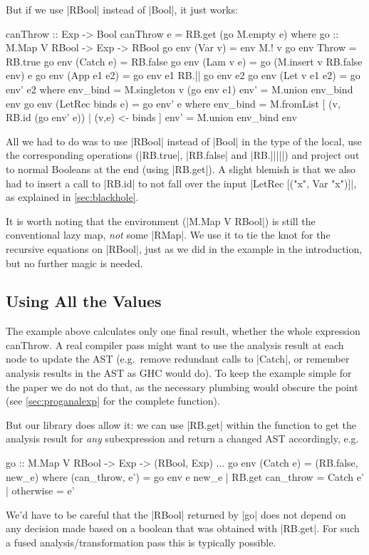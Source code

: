 \documentclass[manuscript,screen,acmsmall,nonacm]{acmart}
\begin{document}
But if we use |RBool| instead of |Bool|, it just works:
\restorecolumns
\begin{code}
canThrow :: Exp -> Bool
canThrow e = RB.get (go M.empty e)
  where
    go :: M.Map V RBool -> Exp -> RBool
    go env (Var v)          = env M.! v
    go env Throw            = RB.true
    go env (Catch e)        = RB.false
    go env (Lam v e)        = go (M.insert v RB.false env) e
    go env (App e1 e2)      = go env e1 RB.|| go env e2
    go env (Let v e1 e2)    = go env' e2
      where
        env_bind  = M.singleton v (go env e1)
        env'      = M.union env_bind env
    go env (LetRec binds e) = go env' e
      where
        env_bind  = M.fromList [ (v, RB.id (go env' e)) | (v,e) <- binds ]
        env'      = M.union env_bind env
\end{code}
All we had to do was to use |RBool| instead of |Bool| in the type of the local, use the corresponding operations (|RB.true|, |RB.false| and |RB.|||||) and  project out to normal Booleans at the end (using |RB.get|). A slight blemish is that we also had to insert a call to |RB.id| to not fall over the input |LetRec [("x", Var "x")]|, as explained in \cref{sec:blackhole}.

It is worth noting that the environment (|M.Map V RBool|) is still the conventional lazy map, \emph{not} some |RMap|. We use it to tie the knot for the recursive equations on |RBool|, just as we did in the example in the introduction, but no further magic is needed.

\subsection{Using All the Values}\label{sec:all-values}

The example above calculates only one final result, whether the whole expression canThrow. A real compiler pass might want to use the analysis result at each node to update the AST (e.g.\ remove redundant calls to |Catch|, or remember analysis results in the AST as GHC would do). To keep the example simple for the paper we do not do that, as the necessary plumbing would obscure the point (see \cref{sec:proganalexp} for the complete function).

But our library does allow it: we can use |RB.get| within the function to get the analysis result for \emph{any} subexpression and return a changed AST accordingly, e.g.
\restorecolumns
\begin{code}
    go :: M.Map V RBool -> Exp -> (RBool, Exp)
    ...
    go env (Catch e)        = (RB.false, new_e)
      where
        (can_throw, e') = go env e
        new_e  |  RB.get can_throw  = Catch e'
               |  otherwise         = e'
\end{code}
We'd have to be careful that the |RBool| returned by |go| does not depend on any decision made based on a boolean that was obtained with |RB.get|. For such a fused analysis/transformation pass this is typically possible.
\end{document}
